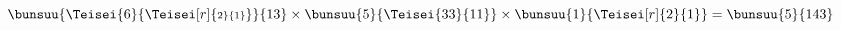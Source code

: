 $\bunsuu{\Teisei{6}{\Teisei[r]{\scriptstyle 2}{1}}}{13}
\times\bunsuu{5}{\Teisei{33}{11}}
\times\bunsuu{1}{\Teisei[r]{2}{1}}=\bunsuu{5}{143}$
